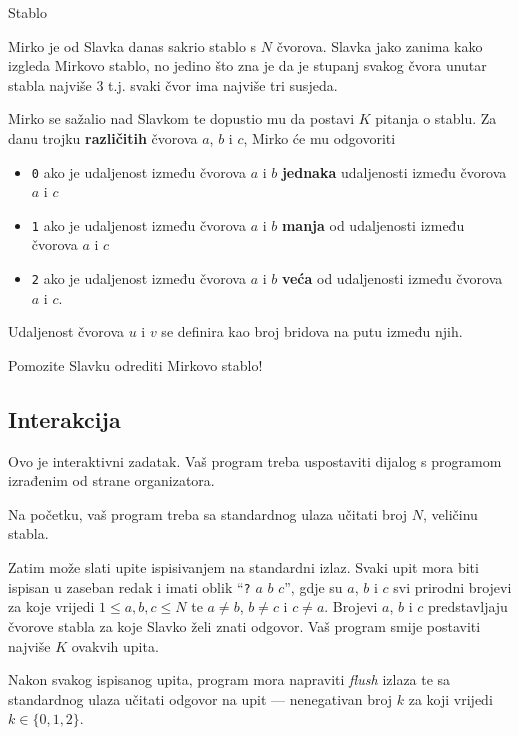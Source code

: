 \begin{statement}[
  problempoints=100,
  timelimit=1 sekunda,
  memorylimit=512 MiB,
]{Stablo}\

Mirko je od Slavka danas sakrio stablo s $N$ čvorova. Slavka jako zanima kako izgleda Mirkovo stablo, no jedino što zna je da je stupanj svakog čvora unutar stabla najviše $3$ t.j. svaki čvor ima najviše tri susjeda.

Mirko se sažalio nad Slavkom te dopustio mu da postavi $K$ pitanja o stablu. Za danu trojku \textbf{različitih} čvorova $a$, $b$ i $c$, Mirko će mu odgovoriti
\begin{itemize}
\item \texttt{0} ako je udaljenost između čvorova $a$ i $b$ \textbf{jednaka} udaljenosti između čvorova $a$ i $c$
\item \texttt{1} ako je udaljenost između čvorova $a$ i $b$ \textbf{manja} od udaljenosti između čvorova $a$ i $c$
\item \texttt{2} ako je udaljenost između čvorova $a$ i $b$ \textbf{veća} od udaljenosti između čvorova $a$ i $c$.
\end{itemize}

Udaljenost čvorova $u$ i $v$ se definira kao broj bridova na putu između njih.

Pomozite Slavku odrediti Mirkovo stablo!

\subsection*{Interakcija}

Ovo je interaktivni zadatak. Vaš program treba uspostaviti dijalog s programom izrađenim od strane organizatora.

Na početku, vaš program treba sa standardnog ulaza učitati broj $N$, veličinu stabla.

Zatim može slati upite ispisivanjem na standardni izlaz. Svaki upit mora biti ispisan u zaseban redak i imati oblik ``\texttt{?} $a$ $b$ $c$'', gdje su $a$, $b$ i $c$ svi prirodni brojevi za koje vrijedi $1 \le a, b, c \le N$ te $a \neq b$, $b \neq c$ i $c \neq a$. Brojevi $a$, $b$ i $c$ predstavljaju čvorove stabla za koje Slavko želi znati odgovor. Vaš program smije postaviti najviše $K$ ovakvih upita.

Nakon svakog ispisanog upita, program mora napraviti \textit{flush} izlaza te sa standardnog ulaza učitati odgovor na upit — nenegativan broj $k$ za koji vrijedi $k \in \{0, 1, 2\}$.


\end{statement}
